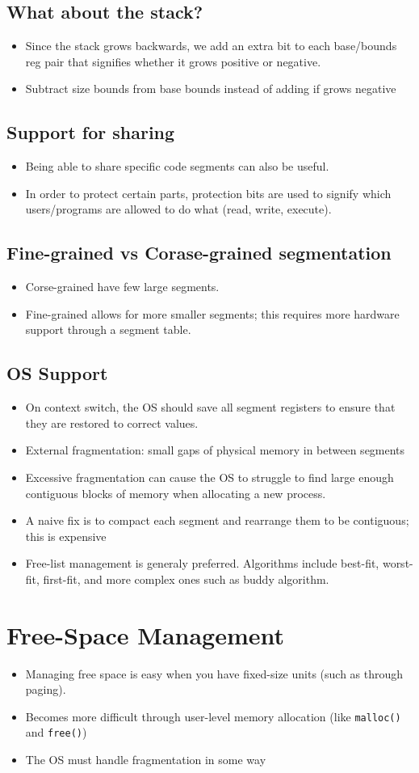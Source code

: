 \documentclass[11pt, a4paper]{article}
\theoremstyle{definition}
\theoremstyle{remark}
\newcommand{\chap}[2]{%
  \renewcommand{\thesection}{\arabic{section}}%
  \renewcommand{\theHsection}{chap.\arabic{section}}%
  \setcounter{section}{#1}\addtocounter{section}{-1}%
  \section{#2}}
\begin{document}
\subsection{What about the stack?}
\begin{itemize}
  \item Since the stack grows backwards, we add an extra bit to each base/bounds reg pair that signifies whether it grows positive or negative.
  \item Subtract size bounds from base bounds instead of adding if grows negative
\end{itemize}
\subsection{Support for sharing}
\begin{itemize}
  \item Being able to share specific code segments can also be useful. 
  \item In order to protect certain parts, protection bits are used to signify which users/programs are allowed to do what (read, write, execute).
\end{itemize}
\subsection{Fine-grained vs Corase-grained segmentation}
\begin{itemize}
  \item Corse-grained have few large segments. 
  \item Fine-grained allows for more smaller segments; this requires more hardware support through a segment table.
\end{itemize}
\subsection{OS Support}
\begin{itemize}
  \item On context switch, the OS should save all segment registers to ensure that they are restored to correct values.
  \item External fragmentation: small gaps of physical memory in between segments
  \item Excessive fragmentation can cause the OS to struggle to find large enough contiguous blocks of memory when allocating a new process.
  \item A naive fix is to compact each segment and rearrange them to be contiguous; this is expensive 
  \item Free-list management is generaly preferred. Algorithms include best-fit, worst-fit, first-fit, and more complex ones such as buddy algorithm.
\end{itemize}
\chap{17}{Free-Space Management}
\begin{itemize}
  \item Managing free space is easy when you have fixed-size units (such as through paging).
  \item Becomes more difficult through user-level memory allocation (like \texttt{malloc()} and \texttt{free()})
  \item The OS must handle fragmentation in some way
\end{itemize}
\end{document}
